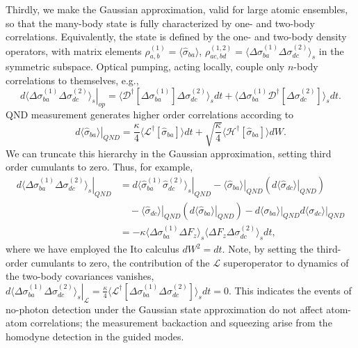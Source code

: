 \documentclass[preprint,aps,pra,onecolumn,superscriptaddress]{revtex4-1} %
\newcommand{\expect}[1]{\big\langle #1 \big\rangle}
\begin{document}
Thirdly, we make the Gaussian approximation, valid for large atomic ensembles, so that the many-body state is fully characterized by one- and two-body correlations. Equivalently, the state is defined by the one- and two-body density operators, with matrix elements $\rho^{(1)}_{a, b} =\expect{\hat{\sigma}_{ba}}$, $\rho^{(1,2)}_{ac,bd}=\expect{\Delta \sigma_{ba}^{(1)}\Delta\sigma_{dc}^{(2)} }_s$ in the symmetric subspace.   Optical pumping, acting locally, couple only $n$-body correlations to themselves, e.g.,
\begin{equation}\label{eq:dsigmabadc_op}
\left.d\expect{\Delta \sigma_{ba}^{(1)}\Delta\sigma_{dc}^{(2)} }_s\right|_{op} = \expect{\mathcal{D}^\dagger[\Delta \sigma_{ba}^{(1)}]\Delta\sigma_{dc}^{(2)} }_sdt + \expect{\Delta \sigma_{ba}^{(1)} \mathcal{D}^\dagger[\Delta\sigma_{dc}^{(2)}] }_sdt .
\end{equation}
QND measurement generates higher order correlations according to
\begin{equation}\label{eq:dsigmaba_QND}
\left.d\expect{\hat{\sigma}_{ba}}\right|_{QND} =\frac{\kappa}{4}\expect{\mathcal{L}^\dagger\left[\hat{\sigma}_{ba} \right]}dt + \sqrt{\frac{\kappa}{4}}\expect{\mathcal{H}^\dagger\left[\hat{\sigma}_{ba} \right]}dW .
\end{equation}
We can truncate this hierarchy in the Gaussian approximation, setting third order cumulants to zero.  Thus, for example,
\begin{align}
\left.d\expect{\Delta \sigma_{ba}^{(1)} \Delta \sigma_{dc}^{(2)}}_s \right|_{QND} &= \left.d\expect{\hat{\sigma}_{ba}^{(1)} \hat{\sigma}_{dc}^{(2)}}_s \right|_{QND} - \left. \expect{\hat{\sigma}_{ba}} \right|_{QND} \left( \left.d\expect{\hat{\sigma}_{dc}} \right|_{QND}\right) \nonumber\\
&\quad - \left. \expect{\hat{\sigma}_{dc}} \right|_{QND} \left( \left.d\expect{\hat{\sigma}_{ba}} \right|_{QND}\right)
- \left.d\expect{\sigma_{ba}} \right|_{QND}\left.d\expect{\sigma_{dc}} \right|_{QND} \nonumber \\
&= -\kappa\expect{\Delta \sigma^{(1)}_{ba}  \Delta F_z }_s \expect{\Delta F_z \Delta \sigma_{dc}^{(2)} }_sdt,\label{eq:dsigmabadc_QND}
\end{align}
where we have employed the Ito calculus $dW^2 = dt$.
Note, by setting the third-order cumulants to zero,  the contribution of the $\mathcal{L}$ superoperator to dynamics of the two-body covariances vanishes,  $ \left.d\expect{\Delta \sigma_{ba}^{(1)} \Delta \sigma_{dc}^{(2)}}_s\right|_\mathcal{L} =\frac{\kappa}{4}\expect{\mathcal{L}^\dagger\left[\Delta\sigma_{ba}^{(1)}\Delta\sigma_{dc}^{(2)} \right]}_sdt=0 $.  This indicates the events of no-photon detection under the Gaussian state approximation do not affect atom-atom correlations;  the measurement backaction and squeezing arise from the homodyne detection in the guided modes. 
\end{document}
